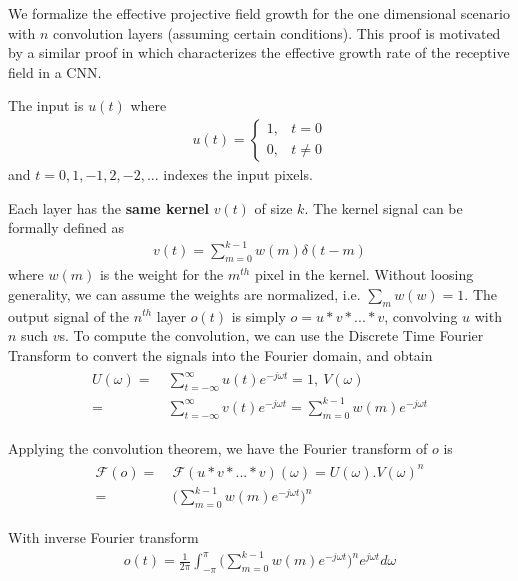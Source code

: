 We formalize the effective projective field growth for the one dimensional scenario with $n$ convolution layers (assuming certain conditions). This proof is motivated by a similar proof in \cite{luo2016understanding} which characterizes the effective growth rate of the receptive field in a CNN.

The input is $u(t)$ where
\begin{align}
	u(t) = 
	\begin{cases}
		1, & t = 0\\
		0, & t \neq 0 
	\end{cases}
\end{align}
and $t = 0, 1, -1, 2, -2, ...$ indexes the input pixels.

Each layer has the \textbf{same kernel} $v(t)$ of size $k$. The kernel signal can be formally defined as
\begin{align}
	v(t) = \sum_{m=0}^{k-1} w(m)\delta(t-m)
\end{align}
where $w(m)$ is the weight for the $m^{th}$ pixel in the kernel.
Without loosing generality, we can assume the weights are normalized, i.e. $\sum_{m}w(w)=1$. The output signal of the $n^{th}$ layer $o(t)$ is simply $o = u * v * ... * v$, convolving $u$ with $n$ such $v$s.
To compute the convolution, we can use the Discrete Time Fourier Transform to convert the signals into the Fourier domain, and obtain
\begin{align}
\begin{split}
	U(\omega) =&~ \sum_{t=-\infty}^{\infty} u(t)e^{-j\omega t} = 1, ~V(\omega) \\=&~ \sum_{t=-\infty}^{\infty} v(t)e^{-j\omega t} = \sum_{m=0}^{k-1} w(m)e^{-j\omega t}
\end{split}
\end{align}

Applying the convolution theorem, we have the Fourier transform of $o$ is
\begin{align}
\begin{split}
	\mathcal{F}(o) =&~ \mathcal{F}(u*v*...*v)(\omega) = U(\omega) . V(\omega)^n \\=&~ \Bigg(\sum_{m=0}^{k-1}w(m)e^{-j\omega t}\Bigg)^n
\end{split}
\end{align}

With inverse Fourier transform
\begin{align}
	o(t) = \frac{1}{2\pi}\int_{-\pi}^{\pi}\Big(\sum_{m=0}^{k-1}w(m)e^{-j\omega t}\Big)^ne^{j\omega t} d\omega
\end{align}

